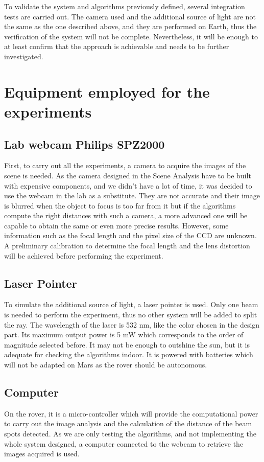 To validate the system and algorithms previously defined, several integration tests are carried out. The camera used and the additional source of light are not the same as the one described above, and they are performed on Earth, thus the verification of the system will not be complete. Nevertheless, it will be enough to at least confirm that the approach is achievable and needs to be further investigated. 

\section{Equipment employed for the experiments}
\subsection{Lab webcam Philips SPZ2000}
First, to carry out all the experiments, a camera to acquire the images of the scene is needed. As the camera designed in the Scene Analysis have to be built with expensive components, and we didn't have a lot of time, it was decided to use the webcam in the lab as a substitute. They are not accurate and their image is blurred when the object to focus is too far from it but if the algorithms compute the right distances with such a camera, a more advanced one will be capable to obtain the same or even more precise results. However, some information such as the focal length and the pixel size of the CCD are unknown. A preliminary calibration to determine the focal length and the lens distortion will be achieved before performing the experiment.

\subsection{Laser Pointer}
To simulate the additional source of light, a laser pointer is used. Only one beam is needed to perform the experiment, thus no other system will be added to split the ray. The wavelength of the laser is 532 nm, like the color chosen in the design part. Its maximum output power is 5 mW which corresponds to the order of magnitude selected before. It may not be enough to outshine the sun, but it is adequate for checking the algorithms indoor. It is powered with batteries which will not be adapted on Mars as the rover should be autonomous. 

\subsection{Computer}
On the rover, it is a micro-controller which will provide the computational power to carry out the image analysis and the calculation of the distance of the beam spots detected. As we are only testing the algorithms, and not implementing the whole system designed, a computer connected to the webcam to retrieve the images acquired is used. 

